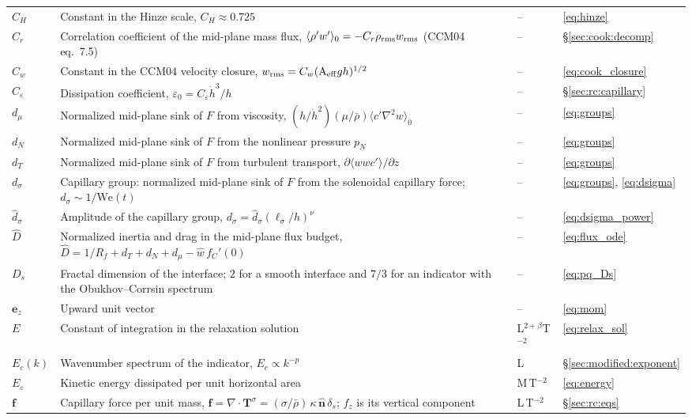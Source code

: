 \documentclass[11pt]{article}
\numberwithin{equation}{section}
\newcommand{\avg}[1]{\langle #1\rangle}
\newcommand{\ls}{\ell_\sigma}
\newcommand{\hd}{\dot h}
\begin{document}
\begin{longtable}{@{}P{0.13}P{0.53}P{0.13}P{0.13}@{}}
$C_H$ & Constant in the Hinze scale, $C_H \approx 0.725$ & -- & \eqref{eq:hinze}\\
$C_r$ & Correlation coefficient of the mid-plane mass flux, $\avg{\rho' w'}_0 = -C_r \rho_{\rm rms} w_{\rm rms}$ (CCM04 eq.~7.5) & -- & \S\ref{sec:cook:decomp}\\
$C_w$ & Constant in the CCM04 velocity closure, $w_{\rm rms} = C_w(\mathrm{A}_\mathrm{eff} g h)^{1/2}$ & -- & \eqref{eq:cook_closure}\\
$C_\varepsilon$ & Dissipation coefficient, $\varepsilon_0 = C_\varepsilon \hd^3/h$ & -- & \S\ref{sec:rc:capillary}\\
$d_\mu$ & Normalized mid-plane sink of $F$ from viscosity, $(h/\hd^2)(\mu/\bar\rho) \avg{c' \nabla^2 w}_0$ & -- & \eqref{eq:groups}\\
$d_N$ & Normalized mid-plane sink of $F$ from the nonlinear pressure $p_N$ & -- & \eqref{eq:groups}\\
$d_T$ & Normalized mid-plane sink of $F$ from turbulent transport, $\partial \avg{w w c'}/\partial z$ & -- & \eqref{eq:groups}\\
$d_\sigma$ & Capillary group: normalized mid-plane sink of $F$ from the solenoidal capillary force; $d_\sigma \sim 1/\mathrm{We}(t)$ & -- & \eqref{eq:groups}, \eqref{eq:dsigma}\\
$\hat d_\sigma$ & Amplitude of the capillary group, $d_\sigma = \hat d_\sigma(\ls/h)^{\nu}$ & -- & \eqref{eq:dsigma_power}\\
$\hat D$ & Normalized inertia and drag in the mid-plane flux budget, $\hat D = 1/R_f + d_T + d_N + d_\mu - \hat w \, f_C'(0)$ & -- & \eqref{eq:flux_ode}\\
$D_s$ & Fractal dimension of the interface; $2$ for a smooth interface and $7/3$ for an indicator with the Obukhov--Corrsin spectrum & -- & \eqref{eq:pq_Ds}\\
$\mathbf e_z$ & Upward unit vector & -- & \eqref{eq:mom}\\
$E$ & Constant of integration in the relaxation solution & L$^{2 + \beta}$T$^{-2}$ & \eqref{eq:relax_sol}\\
$E_c(k)$ & Wavenumber spectrum of the indicator, $E_c \propto k^{-p}$ & L & \S\ref{sec:modified:exponent}\\
$E_\varepsilon$ & Kinetic energy dissipated per unit horizontal area & M\,T$^{-2}$ & \eqref{eq:energy}\\
$\mathbf f$ & Capillary force per unit mass, $\mathbf f = \nabla \cdot \mathbf T^\sigma = (\sigma/\bar\rho) \, \kappa \, \hat{\mathbf n} \, \delta_s$; $f_z$ is its vertical component & L\,T$^{-2}$ & \S\ref{sec:rc:eqs}\\

\end{longtable}
\end{document}
